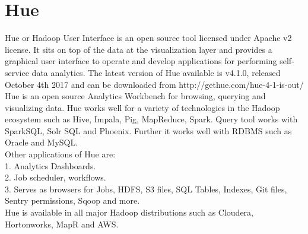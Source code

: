 \section{Hue}

Hue or Hadoop User Interface is an open source tool licensed 
under Apache v2 license. It sits on top of the data at the 
visualization layer and provides a graphical user interface to 
operate and develop applications for performing self-service 
data analytics.
The latest version of Hue available is v4.1.0, released October 
4th 2017 and can be downloaded from http://gethue.com/hue-4-1-is-out/
\cite{hid-sp18-517-hue-apache} \\

Hue is an open source Analytics Workbench for browsing, querying 
and visualizing data.
Hue works well for a variety of technologies in the Hadoop 
ecosystem such as Hive, Impala, Pig, MapReduce, Spark. Query 
tool works with SparkSQL, Solr SQL and Phoenix. Further it works 
well with RDBMS such as Oracle and MySQL. \\

Other applications of Hue are: \\

1. Analytics Dashboards. \\
2. Job scheduler, workflows. \\
3. Serves as browsers for Jobs, HDFS, S3 files, SQL Tables, Indexes, 
Git files, Sentry permissions, Sqoop and more. \\

Hue is available in all major Hadoop distributions such as Cloudera, 
Hortonworks, MapR and AWS. \cite{hid-sp18-517-Hue-wiki}

